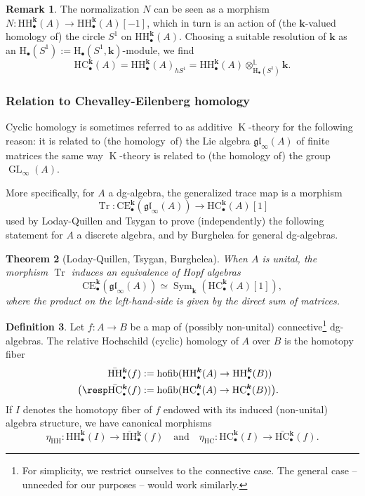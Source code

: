 \documentclass[JEP,XML,SOM,Unicode,NoEqCountersInSection]{cedram}
\let\widebar\bar
\newcommand{\sbullet}{{\scriptscriptstyle\bullet}}
\newtheorem{thm}{Theorem}[subsection]
\theoremstyle{definition}
\newtheorem{df}[thm]{Definition}
\newtheorem{rmq}[thm]{Remark}
\newcommand{\Lcot}{\mathbb{L}}
\DeclareMathOperator{\K}{K}
\DeclareMathOperator{\Sym}{Sym}
\newcommand{\homol}{\mathrm H}
\newcommand{\gl}{\mathfrak{gl}}
\newcommand{\GL}{\operatorname{GL}}
\newcommand{\HC}{\mathrm{HC}}
\newcommand{\HH}{\mathrm{HH}}
\newcommand{\bHH}{\widebar{\mathrm{HH}}{}}
\newcommand{\bHC}{\widebar{\mathrm{HC}}{}}
\renewcommand{\k}{{\boldsymbol{k}}}
\newcommand{\CE}{\mathrm{CE}}
\newcommand{\hofib}{\operatorname{hofib}}
\newcommand{\Tr}{\operatorname{Tr}}
\begin{document}
\begin{rmq}\label{rmq:HChS}
The normalization $N$ can be seen as a morphism $N \colon \HH_\sbullet^\k(A) \to \HH_\sbullet^\k(A)[-1]$, which in turn is an action of (the $\k$-valued homology of) the circle $S^1$ on $\HH_\sbullet^\k(A)$.
Choosing a suitable resolution of $\k$ as an $\homol_\sbullet(S^1) := \homol_\sbullet(S^1,\k)$-module, we find
\[
\HC_\sbullet^\k(A) = {\HH_\sbullet^\k(A)}_{hS^1} = \HH_\sbullet^\k(A) \otimes^\Lcot_{\homol_\sbullet(S^1)} \k.
\]
\end{rmq}

\subsubsection{Relation to Chevalley-Eilenberg homology}\label{par:tracemap}

Cyclic homology is sometimes refer\-red to as additive $\K$-theory for the following reason: it is related to (the homology~of) the Lie algebra $\gl_\infty(A)$ of finite matrices the same way $\K$-theory is related to (the homology of) the group $\GL_\infty(A)$.

More specifically, for $A$ a dg-algebra, the generalized trace map is a morphism
\[
\Tr \colon \CE^\k_\sbullet(\gl_\infty(A)) \to \HC_\sbullet^\k(A) [1]
\]
used by Loday-Quillen \cite{lodayquillen} and Tsygan \cite{tsygan:HC} to prove (independently) the following statement for $A$ a discrete algebra, and by Burghelea \cite{burghelea:cyclicK} for general dg\nobreakdash-alge\-bras.
\begin{thm}[Loday-Quillen, Tsygan, Burghelea]\label{thm:LQT}
When $A$ is unital, the morphism $\Tr$ induces an equivalence of Hopf algebras
\[
\CE^\k_\sbullet(\gl_\infty(A)) \simeq \Sym_\k(\HC_\sbullet^\k(A)[1]),
\]
where the product on the left-hand-side is given by the direct sum of matrices.
\end{thm}

\label{subsec:wodzicki}

\begin{df}
Let $f \colon A \to B$ be a map of (possibly non-unital) connective\footnote{For simplicity, we restrict ourselves to the connective case. The general case -- unneeded for our purposes -- would work similarly.} dg-algebras.
The relative Hochschild (\resp cyclic) homology of $A$ over $B$ is the homo\-topy fiber
\begin{align*}
\bHH_\sbullet^\k(f) &:= \hofib( \HH_\sbullet^\k(A) \to \HH_\sbullet^\k(B)) \hspace{1.5em} \\ \bigl(\resp \bHC_\sbullet^\k(f) &:= \hofib(\HC_\sbullet^\k(A) \to \HC_\sbullet^\k(B)) \bigr).
\end{align*}
If $I$ denotes the homotopy fiber of $f$ endowed with its induced (non-unital) algebra structure, we have canonical morphisms
\[
\eta_\HH \colon \HH_\sbullet^\k(I) \to \bHH_\sbullet^\k(f) \quad\text{and} \quad \eta_\HC \colon \HC_\sbullet^\k(I) \to \bHC_\sbullet^\k(f).
\]

\end{df}
\end{document}
